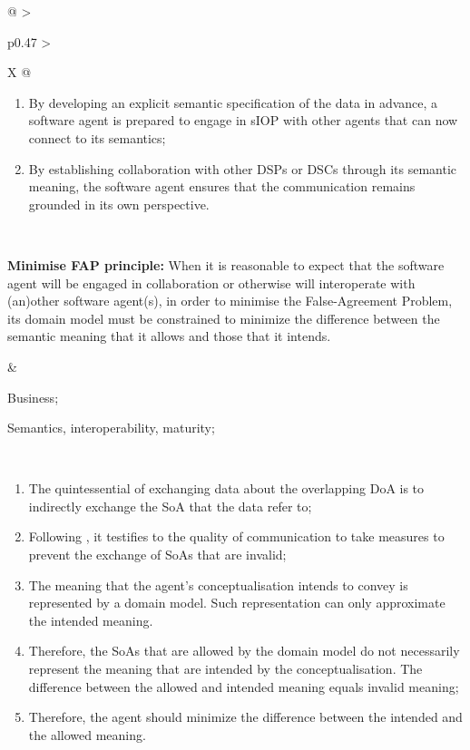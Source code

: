 \begin{xltabular}[l]{\linewidth}{@{} >{\small\raggedright\arraybackslash}p{0.47\linewidth} >{\small\raggedright\arraybackslash}X @{}}
\begin{enumerate}[left=10pt, nosep]
  \item By developing an explicit semantic specification of the data in advance, a software agent is prepared to engage in sIOP with other agents that can now connect to its semantics;
  \item By establishing collaboration with other DSPs or DSCs through its semantic meaning, the software agent ensures that the communication remains grounded in its own perspective.
\end{enumerate} \\
%
%
%
\begin{mmdp}\label{dp:mfapp}{\bfseries Minimise FAP principle:}
\quad When it is reasonable to expect that the software agent will be engaged in collaboration or otherwise will interoperate with (an)other software agent(s), in order to minimise the False-Agreement Problem, its domain model must be constrained to minimize the difference between the semantic meaning that it allows and those that it intends.
\end{mmdp}
&
\begin{description}[labelwidth=3.7cm,leftmargin=3.7cm+1ex,nosep,topsep=2ex,labelsep=1ex,font=\bfseries]
  \item[Type of information:] Business;
  \item[Quality attributes:] Semantics, interoperability, maturity;
\end{description} \\
\begin{enumerate}[left=6pt, nosep]
  \item The quintessential of exchanging data about the overlapping DoA is to indirectly exchange the SoA that the data refer to;
  \item Following \cite{Grice:1991BT}, it testifies to the quality of communication to take measures to prevent the exchange of SoAs that are invalid;
  \item The meaning that the agent's conceptualisation intends to convey is represented by a domain model. Such representation can only approximate the intended meaning. 
  \item Therefore, the SoAs that are allowed by the domain model do not necessarily represent the meaning that are intended by the conceptualisation. The difference between the allowed and intended meaning equals invalid meaning;
  \item Therefore, the agent should minimize the difference between the intended and the allowed meaning.
\end{enumerate}

\end{xltabular}
